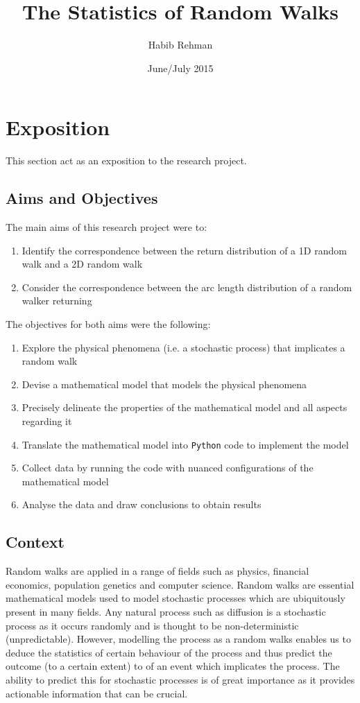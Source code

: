 \documentclass{article}
\title{The Statistics of Random Walks}
\author{Habib Rehman}
\date{June/July 2015}
\begin{document}
\maketitle

\tableofcontents

\hphantom
\newline
\section{Exposition}
This section act as an exposition to the research project.

\subsection{Aims and Objectives}
The main aims of this research project were to:
\begin{enumerate}
	\item{Identify the correspondence between the return distribution of a 1D random walk and a 2D random walk}
	\item{Consider the correspondence between the arc length distribution of a random walker returning}
\end{enumerate}
The objectives for both aims were the following:
\begin{enumerate}
	\item{Explore the physical phenomena (i.e. a stochastic process) that implicates a random walk}
	\item{Devise a mathematical model that models the physical phenomena}
	\item{Precisely delineate the properties of the mathematical model and all aspects regarding it}
	\item{Translate the mathematical model into \texttt{Python} code to implement the model}
	\item{Collect data by running the code with nuanced configurations of the mathematical model}
	\item{Analyse the data and draw conclusions to obtain results}
\end{enumerate}

\subsection{Context}
 Random walks are applied in a range of fields such as physics, financial economics, population genetics and computer science. Random walks are essential mathematical models used to model stochastic processes which are ubiquitously present in many fields. Any natural process such as diffusion is a stochastic process as it occurs randomly and is thought to be non-deterministic (unpredictable). However, modelling the process as a random walks enables us to deduce the statistics of certain behaviour of the process and thus predict the outcome (to a certain extent) to of an event which implicates the process.
The ability to predict this for stochastic processes is of great importance as it provides actionable information that can be crucial.
\end{document}

